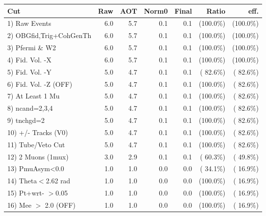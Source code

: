  \begin{table}[h!]\centering
 \begin{tabular}{||l||r|r|r|r|r|r||}
 \hline
 \hline
 Cut & Raw & AOT & Norm0 & Final & Ratio & eff.       \\
 \hline
  1) Raw Events           &          6.0 &          5.7 &          0.1 &          0.1 & (100.0\%) & (100.0\%) \\
  2) OBGfid,Trig+CohGenTh &          6.0 &          5.7 &          0.1 &          0.1 & (100.0\%) & (100.0\%) \\
  3) Pfermi \& W2         &          6.0 &          5.7 &          0.1 &          0.1 & (100.0\%) & (100.0\%) \\
  4) Fid. Vol. -X         &          6.0 &          5.7 &          0.1 &          0.1 & (100.0\%) & (100.0\%) \\
  5) Fid. Vol. -Y         &          5.0 &          4.7 &          0.1 &          0.1 & ( 82.6\%) & ( 82.6\%) \\
  6) Fid. Vol. -Z (OFF)   &          5.0 &          4.7 &          0.1 &          0.1 & (100.0\%) & ( 82.6\%) \\
  7) At Least 1 Mu        &          5.0 &          4.7 &          0.1 &          0.1 & (100.0\%) & ( 82.6\%) \\
  8) ncand=2,3,4          &          5.0 &          4.7 &          0.1 &          0.1 & (100.0\%) & ( 82.6\%) \\
  9) tnchgd=2             &          5.0 &          4.7 &          0.1 &          0.1 & (100.0\%) & ( 82.6\%) \\
 10) +/- Tracks (V0)      &          5.0 &          4.7 &          0.1 &          0.1 & (100.0\%) & ( 82.6\%) \\
 11) Tube/Veto Cut        &          5.0 &          4.7 &          0.1 &          0.1 & (100.0\%) & ( 82.6\%) \\
 12) 2 Muons (1mux)       &          3.0 &          2.9 &          0.1 &          0.1 & ( 60.3\%) & ( 49.8\%) \\
 13) PmuAsym<0.0          &          1.0 &          1.0 &          0.0 &          0.0 & ( 34.1\%) & ( 16.9\%) \\
 14) Theta$<$2.62 rad     &          1.0 &          1.0 &          0.0 &          0.0 & (100.0\%) & ( 16.9\%) \\
 15) Pt+wrt- $>$0.05      &          1.0 &          1.0 &          0.0 &          0.0 & (100.0\%) & ( 16.9\%) \\
 16) Mee $>$ 2.0  (OFF)   &          1.0 &          1.0 &          0.0 &          0.0 & (100.0\%) & ( 16.9\%) \\

\end{tabular}
\end{table}
